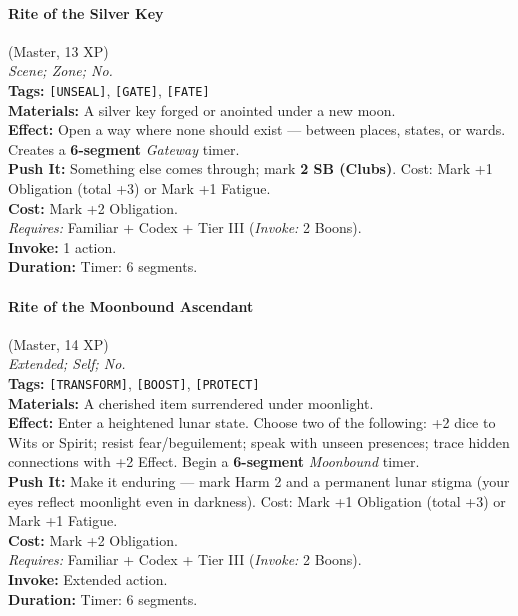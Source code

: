\paragraph{Rite of the Silver Key} (Master, 13 XP) \hfill \\
\emph{Scene; Zone; No.} \\
\textbf{Tags:} \texttt{[UNSEAL]}, \texttt{[GATE]}, \texttt{[FATE]} \\
\textbf{Materials:} A silver key forged or anointed under a new moon. \\
\textbf{Effect:} Open a way where none should exist --- between places, states, or wards. Creates a \textbf{6-segment} \textit{Gateway} timer. \\
\textbf{Push It:} Something else comes through; mark \textbf{2 SB (Clubs)}. Cost: Mark +1 Obligation (total +3) or Mark +1 Fatigue. \\
\textbf{Cost:} Mark +2 Obligation. \\
\textit{Requires:} Familiar + Codex + Tier III (\textit{Invoke:} 2 Boons). \\
\textbf{Invoke:} 1 action. \\
\textbf{Duration:} Timer: 6 segments.

\paragraph{Rite of the Moonbound Ascendant} (Master, 14 XP) \hfill \\
\emph{Extended; Self; No.} \\
\textbf{Tags:} \texttt{[TRANSFORM]}, \texttt{[BOOST]}, \texttt{[PROTECT]} \\
\textbf{Materials:} A cherished item surrendered under moonlight. \\
\textbf{Effect:} Enter a heightened lunar state. Choose two of the following: +2 dice to Wits or Spirit; resist fear/beguilement; speak with unseen presences; trace hidden connections with +2 Effect. Begin a \textbf{6-segment} \textit{Moonbound} timer. \\
\textbf{Push It:} Make it enduring --- mark Harm 2 and a permanent lunar stigma (your eyes reflect moonlight even in darkness). Cost: Mark +1 Obligation (total +3) or Mark +1 Fatigue. \\
\textbf{Cost:} Mark +2 Obligation. \\
\textit{Requires:} Familiar + Codex + Tier III (\textit{Invoke:} 2 Boons). \\
\textbf{Invoke:} Extended action. \\
\textbf{Duration:} Timer: 6 segments.

